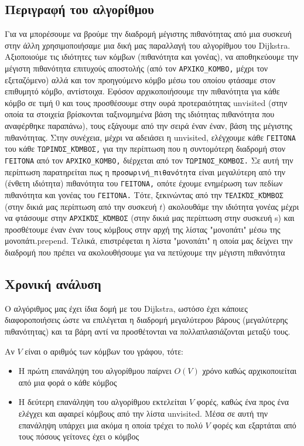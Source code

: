 \documentclass[11pt]{article}
\begin{document}
\subsection{Περιγραφή του αλγορίθμου}
\label{sec:orge82cf1e}
Για να μπορέσουμε να βρούμε την διαδρομή μέγιστης πιθανότητας από μια συσκευή
στην άλλη χρησιμοποιήσαμε μια δική μας παραλλαγή του αλγορίθμου του Dijkstra.
Αξιοποιούμε τις ιδιότητες των κόμβων (πιθανότητα και γονέας), να αποθηκεύουμε
την μέγιστη πιθανότητα επιτυχούς αποστολής (από τον \texttt{ΑΡΧΙΚΟ\_ΚΟΜΒΟ,} μέχρι τον
εξεταζόμενο) αλλά και τον προηγούμενο κόμβο μέσω του οποίου φτάσαμε στον
επιθυμητό κόμβο, αντίστοιχα. Εφόσον αρχικοποιήσουμε την πιθανότητα για κάθε
κόμβο σε τιμή 0 και τους προσθέσουμε στην ουρά προτεραιότητας unvisited (στην
οποία τα στοιχεία βρίσκονται ταξινομημένα βάση της ιδιότητας πιθανότητα που
αναφέρθηκε παραπάνω), τους εξάγουμε από την σειρά έναν έναν, βάση της μέγιστης
πιθανότητας. Στην συνέχεια, μέχρι να αδειάσει η unvisited, ελέγχουμε κάθε
\texttt{ΓΕΙΤΟΝΑ} του κάθε \texttt{ΤΩΡΙΝΌΣ\_ΚΌΜΒΟΣ,} για την περίπτωση που η συντομότερη διαδρομή
στον \texttt{ΓΕΙΤΟΝΑ} από τον \texttt{ΑΡΧΙΚΟ\_ΚΟΜΒΟ,} διέρχεται από τον \texttt{ΤΩΡΙΝΟΣ\_ΚΟΜΒΟΣ.} Σε αυτή την
περίπτωση παρατηρείται πως η \texttt{προσωρινή\_πιθανότητα} είναι μεγαλύτερη από την
(ένθετη ιδιότητα) πιθανότητα του \texttt{ΓΕΙΤΟΝΑ,} οπότε έχουμε ενημέρωση των πεδίων
πιθανότητα και γονέας του \texttt{ΓΕΙΤΟΝΑ.} Τότε, ξεκινώντας από την \texttt{ΤΕΛΙΚΌΣ\_ΚΌΜΒΟΣ} (στην
δικιά μας περίπτωση από την συσκευή \(t\)) ακολουθάμε την ιδιότητα γονέας μέχρι να
φτάσουμε στην \texttt{ΑΡΧΙΚΌΣ\_ΚΌΜΒΟΣ} (στην δικιά μας περίπτωση στην συσκευή s) και
προσθέτουμε έναν έναν τους κόμβους στην αρχή της λίστας "μονοπάτι" μέσω της
μονοπάτι.prepend. Τελικά, επιστρέφεται η λίστα "μονοπάτι" η οποία μας δείχνει
την διαδρομή που πρέπει να ακολουθήσουμε για να πετύχουμε την μέγιστη πιθανότητα
\subsection{Χρονική ανάλυση}
\label{sec:org48a8db3}
Ο αλγόριθμος μας έχει ίδια δομή με του Dijkstra, ωστόσο έχει κάποιες
διαφοροποιήσεις ώστε να επιλέγεται η διαδρομή μεγαλύτερου βάρους (μεγαλύτερης
πιθανότητας) και τα βάρη αντί να προσθέτονται να πολλαπλασιάζονται μεταξύ τους.

Αν \(V\) είναι ο αριθμός των κόμβων του γράφου, τότε:
\begin{itemize}
\item Η πρώτη επανάληψη του αλγορίθμου παίρνει \(O(V)\) χρόνο καθώς αρχικοποιείται από
μια φορά ο κάθε κόμβος
\item Η δεύτερη επανάληψη του αλγορίθμου εκτελείται \(V\) φορές, καθώς ένα προς ένα
ελέγχει και αφαιρεί κόμβους από την λίστα unvisited. Μέσα σε αυτή την
επανάληψη υπάρχει μια ακόμα η οποία τρέχει το πολύ \(V\) φορές και εξαρτάται από
τους πόσους γείτονες έχει ο κόμβος
\end{itemize}
\end{document}
